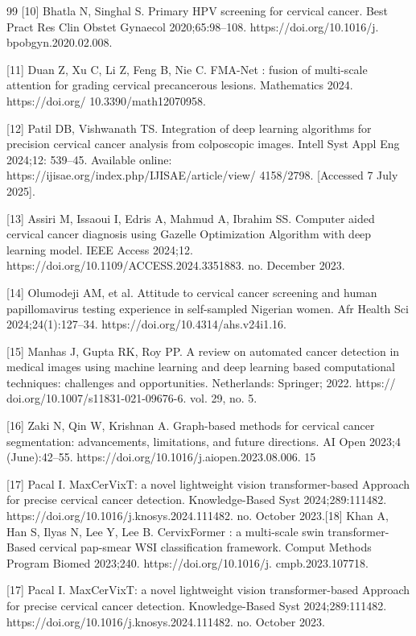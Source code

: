 \documentclass[final,5p,times,twocolumn,authoryear]{elsarticle}
\begin{document}
\begin{thebibliography}{99}
 [10] Bhatla N, Singhal S. Primary HPV screening for cervical cancer. Best Pract Res Clin Obstet Gynaecol 2020;65:98–108. https://doi.org/10.1016/j. bpobgyn.2020.02.008.

 [11] Duan Z, Xu C, Li Z, Feng B, Nie C. FMA-Net : fusion of multi-scale attention for grading cervical precancerous lesions. Mathematics 2024. https://doi.org/ 10.3390/math12070958.

 [12] Patil DB, Vishwanath TS. Integration of deep learning algorithms for precision cervical cancer analysis from colposcopic images. Intell Syst Appl Eng 2024;12: 539–45. Available online: https://ijisae.org/index.php/IJISAE/article/view/ 4158/2798. [Accessed 7 July 2025].

 [13] Assiri M, Issaoui I, Edris A, Mahmud A, Ibrahim SS. Computer aided cervical cancer diagnosis using Gazelle Optimization Algorithm with deep learning model. IEEE Access 2024;12. https://doi.org/10.1109/ACCESS.2024.3351883. no. December 2023.

 [14] Olumodeji AM, et al. Attitude to cervical cancer screening and human papillomavirus testing experience in self-sampled Nigerian women. Afr Health Sci 2024;24(1):127–34. https://doi.org/10.4314/ahs.v24i1.16.

 [15] Manhas J, Gupta RK, Roy PP. A review on automated cancer detection in medical images using machine learning and deep learning based computational techniques: challenges and opportunities. Netherlands: Springer; 2022. https:// doi.org/10.1007/s11831-021-09676-6. vol. 29, no. 5.

 [16] Zaki N, Qin W, Krishnan A. Graph-based methods for cervical cancer segmentation: advancements, limitations, and future directions. AI Open 2023;4 (June):42–55. https://doi.org/10.1016/j.aiopen.2023.08.006. 15

 [17] Pacal I. MaxCerVixT: a novel lightweight vision transformer-based Approach for precise cervical cancer detection. Knowledge-Based Syst 2024;289:111482. https://doi.org/10.1016/j.knosys.2024.111482. no. October 2023.[18] Khan A, Han S, Ilyas N, Lee Y, Lee B. CervixFormer : a multi-scale swin transformer-Based cervical pap-smear WSI classification framework. Comput Methods Program Biomed 2023;240. https://doi.org/10.1016/j. cmpb.2023.107718.

 [17] Pacal I. MaxCerVixT: a novel lightweight vision transformer-based Approach for precise cervical cancer detection. Knowledge-Based Syst 2024;289:111482. https://doi.org/10.1016/j.knosys.2024.111482. no. October 2023.


\end{thebibliography}
\end{document}
